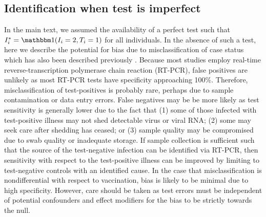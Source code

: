 \begin{appendix}
\section{Identification when test is imperfect}\label{sec:testing}
In the main text, we assumed the availability of a perfect test such that $I^*_i = \mathbbm 1 (I_i = 2, T_i = 1)$ for all individuals. In the absence of such a test, here we describe the potential for bias due to misclassification of case status which has also been described previously \cite{sullivan_theoretical_2016}. Because most studies employ real-time reverse-transcription polymerase chain reaction (RT-PCR), false positives are unlikely as most RT-PCR tests have specificity approaching 100\%. Therefore, misclassification of test-positives is probably rare, perhaps due to sample contamination or data entry errors. False negatives may be be more likely as test sensitivity is generally lower due to the fact that (1) some of those infected with test-positive illness may not shed detectable virus or viral RNA; (2) some may seek care after shedding has ceased; or (3) sample quality may be compromised due to swab quality or inadequate storage. If sample collection is sufficient such that the source of the test-negative infection can be identified via RT-PCR, then sensitivity with respect to the test-positive illness can be improved by limiting to test-negative controls with an identified cause. In the case that misclassification is nondifferential with respect to vaccination, bias is likely to be minimal due to high specificity. However, care should be taken as test errors must be independent of potential confounders and effect modifiers for the bias to be strictly towards the null. 



\newpage

\end{appendix}
